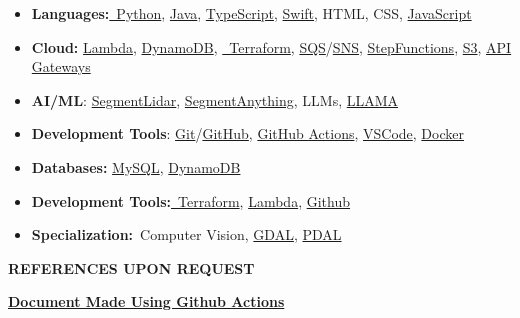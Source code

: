 \begin{itemize}
\item
  \textbf{Languages:}\href{https://www.python.org/}{~Python},
  \href{https://www.java.com/en/}{Java},
  \href{https://www.typescriptlang.org/}{TypeScript},
  \href{https://www.swift.org/}{Swift}, HTML, CSS,
  \href{https://www.javascript.com/}{JavaScript}
\item
  \textbf{Cloud:}
  \href{https://aws.amazon.com/pm/lambda/?gclid=CjwKCAiAiOa9BhBqEiwABCdG8_-jcsK9i3KVP2t5NgupDXinpyF36M-7OgfzGPhJI0F8zaahD0sMmBoC8NIQAvD_BwE\&trk=e0e0d4be-47fe-4336-ab69-7eece7f3d36e\&sc_channel=ps\&ef_id=CjwKCAiAiOa9BhBqEiwABCdG8_-jcsK9i3KVP2t5NgupDXinpyF36M-7OgfzGPhJI0F8zaahD0sMmBoC8NIQAvD_BwE:G:s\&s_kwcid=AL!4422!3!652240143523!e!!g!!amazon\%20lambda!19878797032!147151597893}{Lambda},
  \href{https://aws.amazon.com/dynamodb/}{DynamoDB},
  \href{https://developer.hashicorp.com/terraform/language}{~Terraform},
  \href{https://aws.amazon.com/sqs/}{SQS}/\href{https://aws.amazon.com/sns/}{SNS},
  \href{https://aws.amazon.com/step-functions/}{StepFunctions},
  \href{https://aws.amazon.com/s3/}{S3},
  \href{https://aws.amazon.com/api-gateway/}{API Gateways}
\item
  \textbf{AI/ML}:
  \href{https://github.com/Yarroudh/segment-lidar}{SegmentLidar},
  \href{https://segment-anything.com/}{SegmentAnything}, LLMs,
  \href{https://www.llama.com/}{LLAMA}
\item
  \textbf{Development Tools}:
  \href{https://git-scm.com/}{Git}/\href{https://github.com/}{GitHub},
  \href{https://github.com/TomTheTonk/Resume/actions}{GitHub Actions},
  \href{https://code.visualstudio.com/}{VSCode},
  \href{https://www.docker.com}{Docker}
\item
  \textbf{Databases:} \href{https://www.mysql.com/}{MySQL},
  \href{https://aws.amazon.com/dynamodb/}{DynamoDB}
\item
  \textbf{Development
  Tools:}\href{https://developer.hashicorp.com/terraform/language}{~Terraform},
  \href{https://aws.amazon.com/pm/lambda/?gclid=CjwKCAiAiOa9BhBqEiwABCdG8_-jcsK9i3KVP2t5NgupDXinpyF36M-7OgfzGPhJI0F8zaahD0sMmBoC8NIQAvD_BwE\&trk=e0e0d4be-47fe-4336-ab69-7eece7f3d36e\&sc_channel=ps\&ef_id=CjwKCAiAiOa9BhBqEiwABCdG8_-jcsK9i3KVP2t5NgupDXinpyF36M-7OgfzGPhJI0F8zaahD0sMmBoC8NIQAvD_BwE:G:s\&s_kwcid=AL!4422!3!652240143523!e!!g!!amazon\%20lambda!19878797032!147151597893}{Lambda},
  \href{https://github.com/}{Github}
\item
  \textbf{Specialization:}~Computer Vision,
  \href{https://gdal.org/en/stable/}{GDAL},
  \href{https://pdal.io/en/2.8.4/}{PDAL}
\end{itemize}

\textbf{REFERENCES UPON REQUEST}

\href{http://github.com/TomTheTonk/Resume}{\textbf{Document Made Using
Github Actions}}
